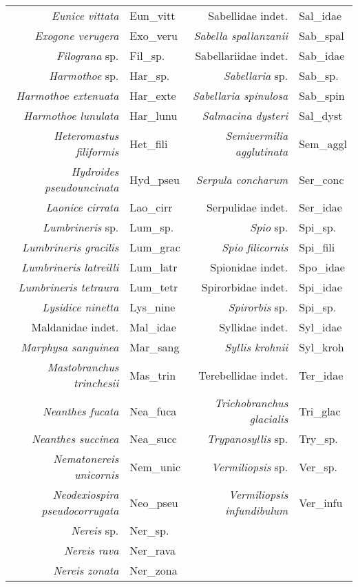 \begin{table}[htb]
\begin{center}
\begin{tabular}{r l r l}
\emph{Eunice vittata} & Eun\_vitt & Sabellidae indet. & Sal\_idae \\
\emph{Exogone verugera} & Exo\_veru & \emph{Sabella spallanzanii} & Sab\_spal \\
\emph{Filograna} sp. & Fil\_sp. & Sabellariidae indet. & Sab\_idae \\
\emph{Harmothoe} sp. & Har\_sp. & \emph{Sabellaria} sp. & Sab\_sp. \\
\emph{Harmothoe extenuata} & Har\_exte & \emph{Sabellaria spinulosa} & Sab\_spin \\
\emph{Harmothoe lunulata} & Har\_lunu & \emph{Salmacina dysteri} & Sal\_dyst \\
\emph{Heteromastus filiformis} & Het\_fili & \emph{Semivermilia agglutinata} & Sem\_aggl \\
\emph{Hydroides pseudouncinata} & Hyd\_pseu & \emph{Serpula concharum} & Ser\_conc \\
\emph{Laonice cirrata} & Lao\_cirr & Serpulidae indet. & Ser\_idae \\
\emph{Lumbrineris} sp. & Lum\_sp. & \emph{Spio} sp. & Spi\_sp. \\
\emph{Lumbrineris gracilis} & Lum\_grac & \emph{Spio filicornis} & Spi\_fili \\
\emph{Lumbrineris latreilli} & Lum\_latr & Spionidae indet. & Spo\_idae \\
\emph{Lumbrineris tetraura}  & Lum\_tetr & Spirorbidae indet. & Spi\_idae \\
\emph{Lysidice ninetta} & Lys\_nine & \emph{Spirorbis} sp. & Spi\_sp. \\
Maldanidae indet. & Mal\_idae & Syllidae indet. & Syl\_idae \\
\emph{Marphysa sanguinea} & Mar\_sang & \emph{Syllis krohnii} & Syl\_kroh \\
\emph{Mastobranchus trinchesii} & Mas\_trin & Terebellidae indet. & Ter\_idae \\
\emph{Neanthes fucata} & Nea\_fuca & \emph{Trichobranchus glacialis} & Tri\_glac \\
\emph{Neanthes succinea} & Nea\_succ & \emph{Trypanosyllis} sp. & Try\_sp. \\
\emph{Nematonereis unicornis} & Nem\_unic & \emph{Vermiliopsis} sp. & Ver\_sp. \\
\emph{Neodexiospira pseudocorrugata} & Neo\_pseu & \emph{Vermiliopsis infundibulum} & Ver\_infu \\
\emph{Nereis} sp. & Ner\_sp. & & \\
\emph{Nereis rava} & Ner\_rava & & \\
\emph{Nereis zonata} & Ner\_zona & & \\
 \bottomrule
 \end{tabular}
 \end{center}
\end{table}

